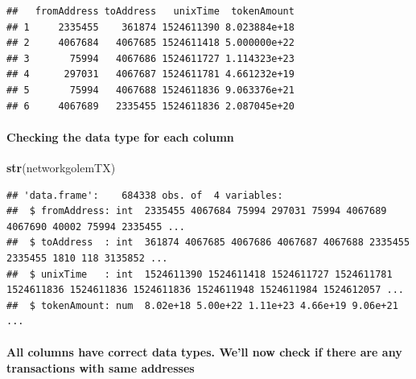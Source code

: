 \documentclass[]{article}
\newenvironment{Shaded}{\begin{snugshade}}{\end{snugshade}}
\newcommand{\KeywordTok}[1]{\textcolor[rgb]{0.13,0.29,0.53}{\textbf{#1}}}
\newcommand{\StringTok}[1]{\textcolor[rgb]{0.31,0.60,0.02}{#1}}
\newcommand{\CommentTok}[1]{\textcolor[rgb]{0.56,0.35,0.01}{\textit{#1}}}
\newcommand{\OperatorTok}[1]{\textcolor[rgb]{0.81,0.36,0.00}{\textbf{#1}}}
\newcommand{\NormalTok}[1]{#1}
\let\oldparagraph\paragraph
\renewcommand{\paragraph}[1]{\oldparagraph{#1}\mbox{}}
\begin{document}
\begin{verbatim}
##   fromAddress toAddress   unixTime  tokenAmount
## 1     2335455    361874 1524611390 8.023884e+18
## 2     4067684   4067685 1524611418 5.000000e+22
## 3       75994   4067686 1524611727 1.114323e+23
## 4      297031   4067687 1524611781 4.661232e+19
## 5       75994   4067688 1524611836 9.063376e+21
## 6     4067689   2335455 1524611836 2.087045e+20
\end{verbatim}

\paragraph{Checking the data type for each
column}\label{checking-the-data-type-for-each-column}

\begin{Shaded}
\begin{Highlighting}[]
\KeywordTok{str}\NormalTok{(networkgolemTX)}
\end{Highlighting}
\end{Shaded}

\begin{verbatim}
## 'data.frame':    684338 obs. of  4 variables:
##  $ fromAddress: int  2335455 4067684 75994 297031 75994 4067689 4067690 40002 75994 2335455 ...
##  $ toAddress  : int  361874 4067685 4067686 4067687 4067688 2335455 2335455 1810 118 3135852 ...
##  $ unixTime   : int  1524611390 1524611418 1524611727 1524611781 1524611836 1524611836 1524611836 1524611948 1524611984 1524612057 ...
##  $ tokenAmount: num  8.02e+18 5.00e+22 1.11e+23 4.66e+19 9.06e+21 ...
\end{verbatim}

\paragraph{All columns have correct data types. We'll now check if there
are any transactions with same
addresses}\label{all-columns-have-correct-data-types.-well-now-check-if-there-are-any-transactions-with-same-addresses}

\begin{Shaded}
\end{Shaded}
\end{document}
